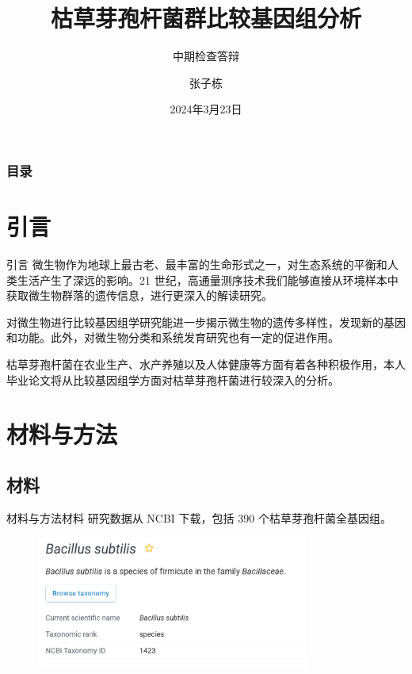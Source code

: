 \documentclass{beamer}
\author[张子栋]{张子栋}
\title[枯草芽孢杆菌群比较基因组分析]{枯草芽孢杆菌群比较基因组分析}
\subtitle{中期检查答辩}
\institute[HZAU CoI]{华中农业大学
	
	信息学院}
\date[2024.3.23]{2024年3月23日}
\begin{document}
	\kaishu
	
	\frame{\titlepage}
	
	\begin{frame}
		\frametitle{目录}
		\tableofcontents
	\end{frame}
	
	\section{引言}

	\begin{frame}{引言}
		\qquad 微生物作为地球上最古老、最丰富的生命形式之一，对生态系统的平衡和人类生活产生了深远的影响。21 世纪，高通量测序技术我们能够直接从环境样本中获取微生物群落的遗传信息，进行更深入的解读研究。

		\qquad 对微生物进行比较基因组学研究能进一步揭示微生物的遗传多样性，发现新的基因和功能。此外，对微生物分类和系统发育研究也有一定的促进作用。

		\qquad 枯草芽孢杆菌在农业生产、水产养殖以及人体健康等方面有着各种积极作用，本人毕业论文将从比较基因组学方面对枯草芽孢杆菌进行较深入的分析。
	\end{frame}

	\section{材料与方法}
	\subsection{材料}
	\begin{frame}{材料与方法}{材料}
		\qquad 研究数据从 NCBI 下载，包括 390 个枯草芽孢杆菌全基因组。

		\begin{figure}
			\centering
			\includegraphics[width=0.8\textwidth]{figure/NCBI.png}
		\end{figure}
	\end{frame}
\end{document}
